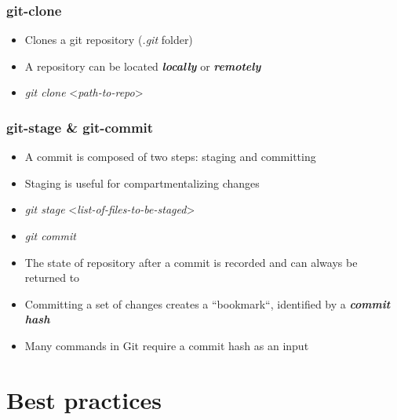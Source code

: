 \documentclass{beamer}
\begin{document}
\begin{frame}
  \frametitle{git-clone}
  \begin{itemize}
  \item<1-> Clones a git repository (\textit{.git} folder)
  \item<2-> A repository can be located \textit{\textbf{locally}} or \textit{\textbf{remotely}}
  \item<3->[] \textit{git clone} {\textless}\textit{path-to-repo}{\textgreater}
  \end{itemize}
\end{frame}

\begin{frame}
  \frametitle{git-stage \& git-commit}
  \begin{itemize}
  \item<1-> A commit is composed of two steps: staging and committing
  \item<2-> Staging is useful for compartmentalizing changes
  \item<3->[] \textit{git stage} {\textless}\textit{list-of-files-to-be-staged}{\textgreater}
  \item<3->[] \textit{git commit}
  \item<4-> The state of repository after a commit is recorded and can always be returned to
  \item<5-> Committing a set of changes creates a ``bookmark``, identified by a \textit{\textbf{commit hash}}
  \item<6-> Many commands in Git require a commit hash as an input
  \end{itemize}
\end{frame}

\section{Best practices}
\end{document}
